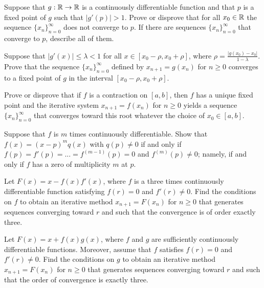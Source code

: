 \begin{question}
Suppose that $g:\mathbb{R}\rightarrow \mathbb{R}$ is a continuously differentiable
function and that $p$ is a fixed point of $g$ such that $|g'(p)| > 1$.
Prove or disprove that for all $x_0\in \mathbb{R}$ the sequence
$\{x_n\}_{n=0}^\infty$ does not converge to $p$.  If there are
sequences $\{x_n\}_{n=0}^\infty$ that converge to $p$, describe all of
them.
\label{solvAQ26}
\end{question}

\begin{question}
Suppose that $|g'(x)| \leq \lambda < 1$ for all
$x \in [x_0-\rho,x_0+\rho]$, where
$\displaystyle \rho = \frac{|g(x_0)-x_0|}{1-\lambda}$.
Prove that the sequence $\{x_n\}_{n=0}^\infty$ defined by
$x_{n+1} = g(x_n)$ for $n \geq 0$ converges to a fixed point of $g$ in
the interval $[x_0-\rho,x_0+\rho]$.
\label{solvAQ27}
\end{question}

\begin{question}
Prove or disprove that if $f$ is a contraction on $[a,b]$, then $f$
has a unique fixed point and the iterative system $x_{n+1} = f(x_n)$
for $n \geq 0$ yields a sequence $\{x_n\}_{n=0}^\infty$
that converges toward this root whatever the choice of $x_0 \in [a,b]$. 
\label{solvAQ28}
\end{question}

\begin{question}
Suppose that $f$ is $m$ times continuously differentiable.  Show that
$f(x) = (x-p)^m q(x)$ with $q(p) \neq 0$  if and only if
$f(p) = f'(p) = ... = f^{(m-1)}(p) = 0$ and $f^{(m)}(p) \neq 0$; namely,
if and only if $f$ has a zero of multiplicity $m$ at $p$.
\label{solvAQ29}
\end{question}

\begin{question}
Let $F(x) = x - f(x)f'(x)$, where $f$ is a three times continuously
differentiable function satisfying $f(r)=0$ and $f'(r)\neq 0$.
Find the conditions on $f$ to obtain an iterative method
$x_{n+1} = F(x_n)$ for $n \geq 0$ that generates sequences
converging toward $r$ and such that the convergence is of order
exactly three.
\label{solvAQ30}
\end{question}

\begin{question}
Let $F(x) = x + f(x)g(x)$, where $f$ and $g$ are sufficiently
continuously differentiable functions.  Moreover, assume that $f$
satisfies $f(r)=0$ and $f'(r)\neq 0$.  Find the conditions on $g$ to
obtain an iterative method $x_{n+1} = F(x_n)$ for $n\geq 0$ that
generates sequences converging toward $r$ and such that the order of
convergence is exactly three.
\label{solvAQ31}
\end{question}

